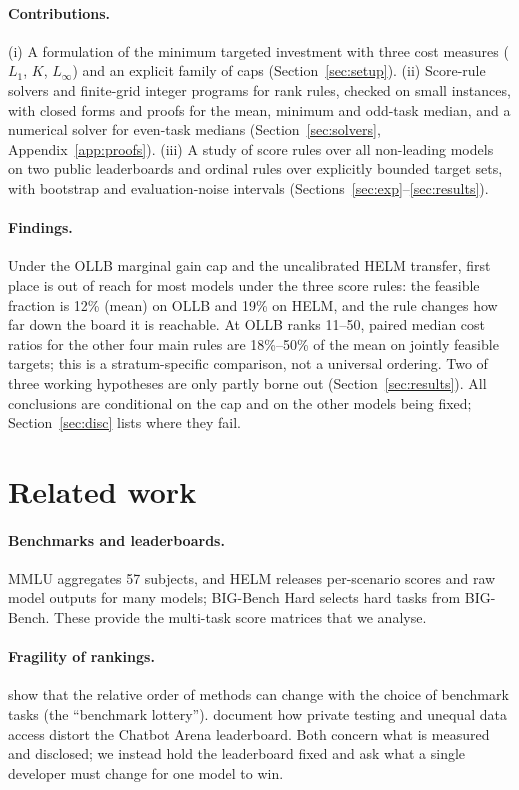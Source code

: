 \documentclass{article}
\begin{document}
\paragraph{Contributions.}
(i) A formulation of the minimum targeted investment with three cost measures ($L_1$, $K$, $L_\infty$) and an explicit family of caps (Section~\ref{sec:setup}). (ii) Score-rule solvers and finite-grid integer programs for rank rules, checked on small instances, with closed forms and proofs for the mean, minimum and odd-task median, and a numerical solver for even-task medians (Section~\ref{sec:solvers}, Appendix~\ref{app:proofs}). (iii) A study of score rules over all non-leading models on two public leaderboards and ordinal rules over explicitly bounded target sets, with bootstrap and evaluation-noise intervals (Sections~\ref{sec:exp}--\ref{sec:results}).

\paragraph{Findings.}
Under the OLLB marginal gain cap and the uncalibrated HELM transfer, first place is out of reach for most models under the three score rules: the feasible fraction is 12\% (mean) on OLLB and 19\% on HELM, and the rule changes how far down the board it is reachable. At OLLB ranks 11--50, paired median cost ratios for the other four main rules are 18\%--50\% of the mean on jointly feasible targets; this is a stratum-specific comparison, not a universal ordering. Two of three working hypotheses are only partly borne out (Section~\ref{sec:results}). All conclusions are conditional on the cap and on the other models being fixed; Section~\ref{sec:disc} lists where they fail.

\section{Related work}
\label{sec:related}
\paragraph{Benchmarks and leaderboards.}
MMLU \citep{hendrycks2021mmlu} aggregates 57 subjects, and HELM \citep{liang2023helm} releases per-scenario scores and raw model outputs for many models; BIG-Bench Hard \citep{suzgun2023bbh} selects hard tasks from BIG-Bench. These provide the multi-task score matrices that we analyse.

\paragraph{Fragility of rankings.}
\citet{dehghani2021lottery} show that the relative order of methods can change with the choice of benchmark tasks (the ``benchmark lottery''). \citet{singh2025illusion} document how private testing and unequal data access distort the Chatbot Arena leaderboard. Both concern what is measured and disclosed; we instead hold the leaderboard fixed and ask what a single developer must change for one model to win.
\end{document}
